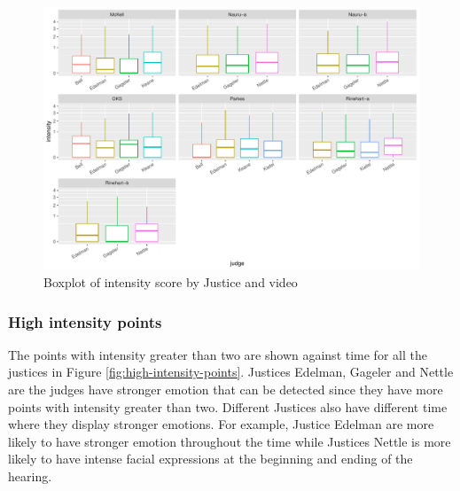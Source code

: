 \documentclass{monashthesis}
\begin{document}
\begin{figure}

{\centering \includegraphics[width=1\linewidth]{figures/intensity-boxplot-1} 

}

\caption{Boxplot of intensity score by Justice and video\label{fig:intensity}}\label{fig:intensity-boxplot}
\end{figure}

\hypertarget{high-intensity-points}{%
\subsubsection{High intensity points}\label{high-intensity-points}}

The points with intensity greater than two are shown against time for all the justices in Figure \ref{fig:high-intensity-points}. Justices Edelman, Gageler and Nettle are the judges have stronger emotion that can be detected since they have more points with intensity greater than two. Different Justices also have different time where they display stronger emotions. For example, Justice Edelman are more likely to have stronger emotion throughout the time while Justices Nettle is more likely to have intense facial expressions at the beginning and ending of the hearing.
\end{document}
